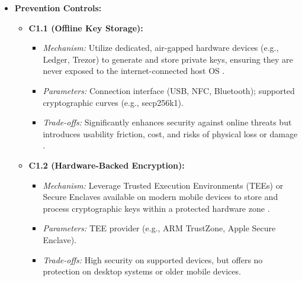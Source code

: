 \begin{itemize}
    \item \textbf{Prevention Controls:}
    \begin{itemize}
        \item \textbf{C1.1 (Offline Key Storage):}
            \begin{itemize}
                \item \textit{Mechanism:} Utilize dedicated, air-gapped hardware devices (e.g., Ledger, Trezor) to generate and store private keys, ensuring they are never exposed to the internet-connected host OS \cite{suratkar2020}.
                \item \textit{Parameters:} Connection interface (USB, NFC, Bluetooth); supported cryptographic curves (e.g., secp256k1).
                \item \textit{Trade-offs:} Significantly enhances security against online threats but introduces usability friction, cost, and risks of physical loss or damage \cite{yu2024}.
            \end{itemize}
        \item \textbf{C1.2 (Hardware-Backed Encryption):}
            \begin{itemize}
                \item \textit{Mechanism:} Leverage Trusted Execution Environments (TEEs) or Secure Enclaves available on modern mobile devices to store and process cryptographic keys within a protected hardware zone \cite{houy2023}.
                \item \textit{Parameters:} TEE provider (e.g., ARM TrustZone, Apple Secure Enclave).
                \item \textit{Trade-offs:} High security on supported devices, but offers no protection on desktop systems or older mobile devices.
            \end{itemize}
    \end{itemize}


\end{itemize}
